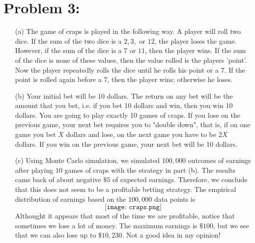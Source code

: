 \documentclass[11pt]{article}
\begin{document}
\section*{Problem 3:}
\begin{itemize}
\item[(a)]  The game of craps is played in the following way.  A player will roll two dice.  If the sum of the two dice is a $2,3,$ or $12$, the player loses the game.  However, if the sum of the dice is a $7$ or $11$, then the player wins.  If the sum of the dice is none of these values, then the value rolled is the players 'point'.  Now the player repeatedly rolls the dice until he rolls his point or a 7.  If the point is rolled again before a 7, then the player wins; otherwise he loses.

\item[(b)]  Your initial bet will be 10 dollars.  The return on any bet will be the amount that you bet, i.e. if you bet 10 dollars and win, then you win 10 dollars.  You are going to play exactly 10 games of craps.  If you lose on the previous game, your next bet requires you to "double down", that is, if on one game you bet $X$ dollars and lose, on the next game you have to be $2X$ dollars.  If you win on the previous game, your next bet will be 10 dollars.

\item[(c)]  Using Monte Carlo simulation, we simulated $100,000$ outcomes of earnings after playing $10$ games of craps with the strategy in part (b).  The results came back of about negative $\$5$ of expected earnings.  Therefore, we conclude that this does not seem to be a profitable betting strategy.  The empirical distribution of earnings based on the $100,000$ data points is
\[
\texttt{[image: craps.png]}
\]
Althought it appears that most of the time we are profitable, notice that sometimes we lose a lot of money.  The maximum earnings is $\$100$, but we see that we can also lose up to $\$10,230$.  Not a good idea in my opinion!
\end{itemize}
\end{document}

